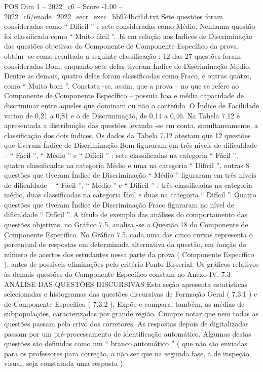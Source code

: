 \begin{textsample}{POS Dim 1 – 2022\_c6 – Score -1.00 – 2022\_c6/enade\_2022\_secr\_exec\_bb974bcf1d.txt}
Sete questões foram consideradas como “ Difícil ” e sete consideradas como Médio.
Nenhuma questão foi classificada como “ Muito fácil ”.
Já em relação aos Índices de Discriminação das questões objetivas do Componente de Componente Específico da prova, obtém -se como resultado a seguinte classificação : 12 das 27 questões foram consideradas Bom, enquanto sete delas tiveram Índice de Discriminação Médio.
Dentre as demais, quatro delas foram classificadas como Fraco, e outras quatro, como “ Muito bom ”.
Constata -se, assim, que a prova – no que se refere ao Componente de Componente Específico – possuía boa e média capacidade de discriminar entre aqueles que dominam ou não o conteúdo.
O Índice de Facilidade variou de 0,21 a 0,81 e o de Discriminação, de 0,14 a 0,46.
Na Tabela 7.12 é apresentada a distribuição das questões levando -se em conta, simultaneamente, a classificação dos dois índices.
Os dados da Tabela 7.12 atestam que 12 questões que tiveram Índice de Discriminação Bom figuraram em três níveis de dificuldade – “ Fácil ”, “ Médio ” e “ Difícil ” : sete classificadas na categoria “ Fácil ”, quatro classificadas na categoria Médio e uma na categoria “ Difícil ”, outras 8 questões que tiveram Índice de Discriminação “ Médio ” figuraram em três níveis de dificuldade – “ Fácil ”, “ Médio ” e “ Difícil ” : três classificadas na categoria médio, duas classificadas na categoria fácil e duas na categoria “ Difícil ”.
Quatro questões que tiveram Índice de Discriminação Fraco figuraram no nível de dificuldade “ Difícil ”.
A título de exemplo das análises do comportamento das questões objetivas, no Gráfico 7.5, analisa -se a Questão 18 do Componente de Componente Específico.
No Gráfico 7.5, cada uma das cinco curvas representa o percentual de respostas em determinada alternativa da questão, em função do número de acertos dos estudantes nessa parte da prova ( Componente Específico ), antes de possíveis eliminações pelo critério Ponto-Bisserial.
Os gráficos relativos às demais questões do Componente Específico constam no Anexo IV. 7.3 ANÁLISE DAS QUESTÕES DISCURSIVAS Esta seção apresenta estatísticas selecionadas e histogramas das questões discursivas de Formação Geral ( 7.3.1 ) e de Componente Específico ( 7.3.2 ).
Expõe e compara, também, as médias de subpopulações, caracterizadas por grande região.
Cumpre notar que nem todas as questões passam pelo crivo dos corretores.
As respostas depois de digitalizadas passam por um pré-processamento de identificação automático.
Algumas destas questões são definidas como um “ branco automático ” ( que não são enviadas para os professores para correção, a não ser que na segunda fase, a de inspeção visual, seja constatada uma resposta ).

\end{textsample}

